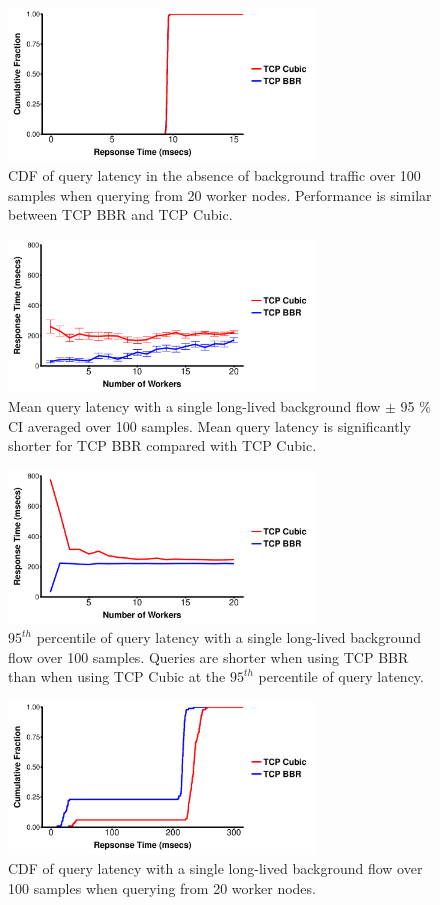 \documentclass[letterpaper,twocolumn,10pt]{article}
\begin{document}
\begin{figure}
\includegraphics[height=1.6in,width=3.2in]{plots/query_cdf.pdf}
\caption{CDF of query latency in the absence of background traffic over 100 samples when querying from 20 worker nodes. Performance is similar between TCP BBR and TCP Cubic.}
\end{figure}

\begin{figure}
\includegraphics[height=1.6in,width=3.2in]{plots/query_bg_avg.pdf} 
\caption{Mean query latency with a single long-lived background flow $\pm$ 95 \% CI averaged over 100 samples. Mean query latency is significantly shorter for TCP BBR compared with TCP Cubic.}
\end{figure}

\begin{figure}
\includegraphics[height=1.6in,width=3.2in]{plots/query_bg_percentile.pdf}
\caption{$95^{th}$ percentile of query latency with a single long-lived background flow over 100 samples. Queries are shorter when using TCP BBR than when using TCP Cubic at the $95^{th}$ percentile of query latency.}
\end{figure}

\begin{figure}
\includegraphics[height=1.6in,width=3.2in]{plots/query_bg_cdf.pdf}
\caption{CDF of query latency with a single long-lived background flow over 100 samples when querying from 20 worker nodes.}
\end{figure}
\end{document}

